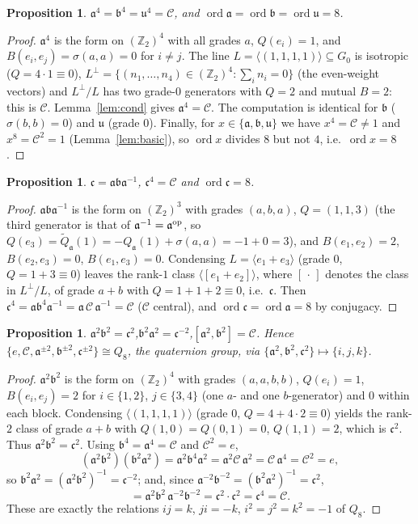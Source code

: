 \documentclass[aps,twocolumn,prx,floatfix,preprintnumbers, nofootinbib,10pt]{revtex4-2}
\numberwithin{equation}{section}
\newtheorem{proposition}[theorem]{Proposition}
\theoremstyle{definition}
\theoremstyle{remark}
\theoremstyle{claim}
\newcommand{\be}{\begin{equation}}
\newcommand{\ee}{\end{equation}}
\newcommand{\ord}{\operatorname{ord}}
\newcommand{\ga}{\mathfrak{a}}
\newcommand{\gb}{\mathfrak{b}}
\newcommand{\gc}{\mathfrak{c}}
\newcommand{\gu}{\mathfrak{u}}
\newcommand{\Z}{{\mathbb Z}}
\newcommand{\cC}{\mathcal{C}}
\begin{document}
\begin{proposition}\label{prop:ord8}
$\ga^4=\gb^4=\gu^4=\cC$, and $\ord\ga=\ord\gb=\ord\gu=8$.
\end{proposition}

\begin{proof}
$\ga^4$ is the form on $(\Z_2)^4$ with all grades $a$, $Q(e_i)=1$, and $B(e_i,e_j)={\sigma(a,a)=0}$
for $i\neq j$. The line $L=\langle(1,1,1,1)\rangle\subseteq G_0$ is isotropic
($Q=4\cdot1\equiv0$), $L^\perp=\{(n_1,\dots,n_4)\in(\Z_2)^4:\textstyle\sum_i n_i=0\}$ (the even-weight vectors) and $L^\perp/L$ has two grade-$0$
generators with $Q=2$ and mutual $B=2$: this is $\cC$. Lemma~\ref{lem:cond} gives $\ga^4=\cC$.
The computation is identical for $\gb$ ($\sigma(b,b)=0$) and $\gu$ (grade $0$).
Finally, for $x\in\{\ga,\gb,\gu\}$ we have $x^4=\cC\neq1$ and $x^8=\cC^2=1$
(Lemma~\ref{lem:basic}), so $\ord x$ divides $8$ but not $4$, i.e.\ $\ord x=8$.
\end{proof}

\begin{proposition}\label{prop:c}
$\gc=\ga\gb\ga^{-1}$, $\gc^4=\cC$ and $\ord\gc=8$.
\end{proposition}

\begin{proof}
$\ga\gb\ga^{-1}$ is the form on $(\Z_2)^3$ with grades $(a,b,a)$, $Q=(1,1,3)$ (the
third generator is that of $\ga^{-1}=\ga^{\rm op}$, so
$Q(e_3)=\widetilde Q_{\ga}(1)=-Q_{\ga}(1)+\sigma(a,a)=-1+0=3$), and
$B(e_1,e_2)=2$, 
$B(e_2,e_3)=0$, 
$B(e_1,e_3)=0$.
Condensing $L=\langle e_1{+}e_3\rangle$ (grade $0$, $Q=1+3\equiv0$) leaves the rank-$1$ class
$\langle[e_1{+}e_2]\rangle$, where $[\,\cdot\,]$ denotes the class in $L^\perp/L$, of grade $a+b$ with $Q=1+1+2\equiv0$, i.e.\ $\gc$. Then
$\gc^4=\ga\gb^4\ga^{-1}=\ga\,\cC\,\ga^{-1}=\cC$ ($\cC$ central), and $\ord\gc=\ord\ga=8$ by
conjugacy.
\end{proof}

\begin{proposition}\label{prop:Q8}
$\ga^2\gb^2=\gc^2$,\quad $\gb^2\ga^2=\gc^{-2}$,\quad $[\ga^2,\gb^2]=\cC$. Hence
$\{e,\cC,\ga^{\pm2},\gb^{\pm2},\gc^{\pm2}\}\cong Q_8$, the quaternion group, via $\{\ga^2,\gb^2,\gc^2\}\mapsto \{i,j,k\}$.
\end{proposition}

\begin{proof}
$\ga^2\gb^2$ is the form on $(\Z_2)^4$ with grades $(a,a,b,b)$, $Q(e_i)=1$, $B(e_i,e_j)=2$ for
$i\in\{1,2\}$, $j\in\{3,4\}$ (one $a$- and one $b$-generator) and $0$ within each block.
Condensing $\langle(1,1,1,1)\rangle$ (grade $0$, $Q=4+4\cdot2\equiv0$) yields the rank-$2$ class of
grade $a+b$ with $Q(1,0)=Q(0,1)=0$, $Q(1,1)=2$, which is $\gc^2$. Thus $\ga^2\gb^2=\gc^2$.
Using $\gb^4=\ga^4=\cC$ and $\cC^2=e$,
\be
  (\ga^2\gb^2)(\gb^2\ga^2)=\ga^2\gb^4\ga^2=\ga^2\cC\,\ga^2=\cC\,\ga^4=\cC^2=e,
\ee
so $\gb^2\ga^2=(\ga^2\gb^2)^{-1}=\gc^{-2}$; and, since $\ga^{-2}\gb^{-2}=(\gb^2\ga^2)^{-1}=\gc^2$,
\be
  [\ga^2,\gb^2]=\ga^2\gb^2\,\ga^{-2}\gb^{-2}=\gc^2\cdot\gc^2=\gc^4=\cC .
\ee
These are exactly the relations $ij=k$, $ji=-k$, $i^2=j^2=k^2=-1$ of $Q_8$.
\end{proof}
\end{document}
